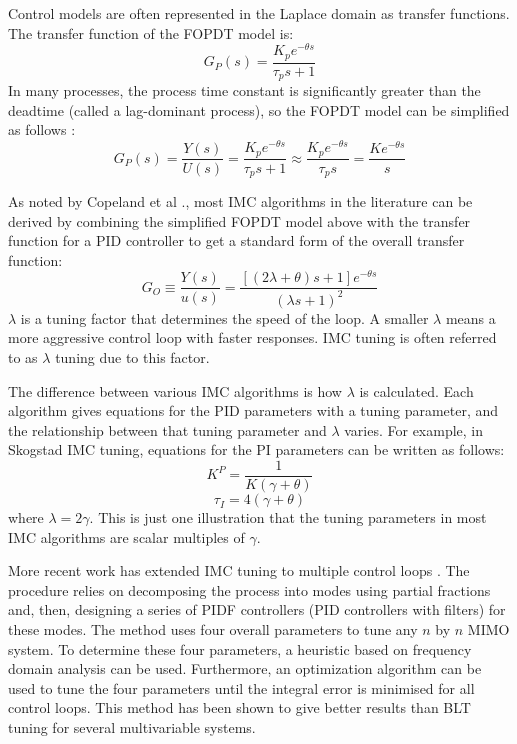 Control models are often represented in the Laplace domain as transfer functions. The transfer function of the FOPDT model is:
\begin{equation}
    G_P(s) = \frac{K_p e^{-\theta s}}{\tau_p s +1}
\end{equation}
In many processes, the process time constant is significantly greater than the deadtime (called a lag-dominant process), so the FOPDT model can be simplified as follows \cite{Copeland2010}:
\begin{equation}
    G_P(s) = \frac{Y(s)}{U(s)} = \frac{K_p e^{-\theta s}}{\tau_p s +1} \approx \frac{K_p e^{-\theta s}}{\tau_p s } = \frac{K e^{-\theta s}}{s}
\end{equation}

As noted by Copeland et al \cite{Copeland2010}., most IMC algorithms in the literature can be derived by combining the simplified FOPDT model above with the transfer function for a PID controller to get a standard form of the overall transfer function:
\begin{equation}
    G_O \equiv \frac{Y(s)}{u(s)} = \frac{[(2\lambda + \theta)s+1]e^{-\theta s}}{(\lambda s+1)^2}
\end{equation}
$\lambda$ is a tuning factor that determines the speed of the loop. A smaller $\lambda$ means a more aggressive control loop with faster responses. IMC tuning is often referred to as $\lambda$ tuning due to this factor. 

The difference between various IMC algorithms is how $\lambda$ is calculated. Each algorithm gives equations for the PID parameters with a tuning parameter, and the relationship between that tuning parameter and $\lambda$ varies. For example, in Skogstad IMC tuning, equations for the PI parameters can be written as follows\cite{Copeland2010}: 
\begin{equation}
    K^P = \frac{1}{K(\gamma +\theta)}
\end{equation}
\begin{equation}
    \tau_I = 4(\gamma+\theta)
\end{equation}
where $\lambda=2\gamma$. This is just one illustration that the tuning parameters in most IMC algorithms are scalar multiples of $\gamma$.

More recent work has extended IMC tuning to multiple control loops \cite{Nandong2013, Nandong2015}. The procedure relies on decomposing the process into modes using partial fractions and, then, designing a series of PIDF controllers (PID controllers with filters) for these modes. The method uses four overall parameters to tune any $n$ by $n$ MIMO system. To determine these four parameters, a heuristic based on frequency domain analysis can be used. Furthermore, an optimization algorithm can be used to tune the four parameters until the integral error is minimised for all control loops. This method has been shown to give better results than BLT tuning for several  multivariable systems.  


